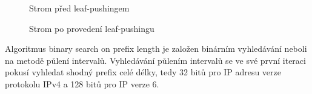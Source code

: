 \begin{figure}[!htbp]
	\begin{floatrow}
			{\caption{Strom před leaf-pushingem}\label{bspl-not-pushed}}
			{\caption{Strom po provedení leaf-pushingu}\label{bspl-pushed}}
	\end{floatrow}
\end{figure}

Algoritmus binary search on prefix length je založen binárním vyhledávání neboli na metodě
půlení intervalů. Vyhledávání půlením intervalů
se ve své první iteraci pokusí vyhledat shodný prefix celé délky, tedy 32 bitů pro IP adresu
verze protokolu IPv4 a 128 bitů pro IP verze 6.

